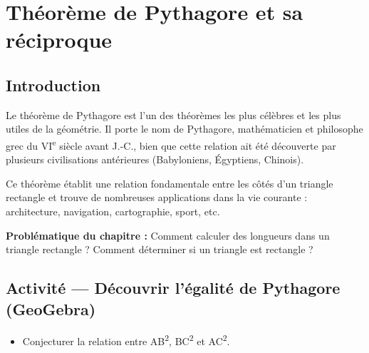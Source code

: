 \chapter{Théorème de Pythagore et sa réciproque}

\section{Introduction}
Le théorème de Pythagore est l'un des théorèmes les plus célèbres et les plus utiles de la géométrie. Il porte le nom de Pythagore, mathématicien et philosophe grec du VI\textsuperscript{e} siècle avant J.-C., bien que cette relation ait été découverte par plusieurs civilisations antérieures (Babyloniens, Égyptiens, Chinois).

Ce théorème établit une relation fondamentale entre les côtés d'un triangle rectangle et trouve de nombreuses applications dans la vie courante : architecture, navigation, cartographie, sport, etc.

\textbf{Problématique du chapitre :} Comment calculer des longueurs dans un triangle rectangle ? Comment déterminer si un triangle est rectangle ?

\section{Activité — Découvrir l’égalité de Pythagore (GeoGebra)}

\begin{objectifsbox} 
	\begin{itemize}
	\item[\textbullet] Conjecturer la relation entre AB\textsuperscript{2}, BC\textsuperscript{2} et AC\textsuperscript{2}.
	\end{itemize}
\end{objectifsbox}

